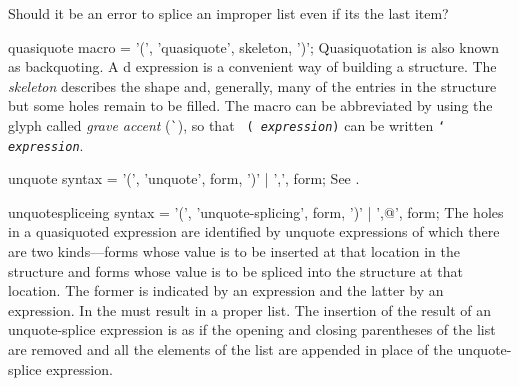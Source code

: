 \gdef\module{syntax-0}
\label{backquote}
%
\begin{optPrivate}
    Should it be an error to splice an improper list even if its the last item?
\end{optPrivate}
%
\begin{optDefinition}

%
\Syntax
\savesyntax\quasiquoteSyntax\vbox{\syntax
quasiquote macro
   = '(', 'quasiquote', skeleton, ')';
\endsyntax}
%
\remarks%
Quasiquotation is also known as backquoting.  A d
expression is a convenient way of building a structure.  The {\em skeleton}
describes the shape and, generally, many of the entries in the structure but
some holes remain to be filled.  The  macro can be
abbreviated by using the glyph called {\em grave accent}
(\verb+`+), so that {\tt
    ( {\em expression})} can be written {\tt `{\em
        expression}}.

%
\Syntax
\savesyntax\unquoteSyntax\vbox{\syntax
unquote syntax
   = '(', 'unquote', form, ')'
   | ',', form;
\endsyntax}
%
\remarks%
See .

%
\Syntax
\savesyntax\unquotespliceSyntax\vbox{\syntax
unquotespliceing syntax
   = '(', 'unquote-splicing', form, ')'
   | ',@', form;
\endsyntax}
%
\remarks%
The holes in a quasiquoted expression are identified by unquote expressions of
which there are two kinds---forms whose value is to be inserted at that location
in the structure and forms whose value is to be spliced into the structure at
that location.  The former is indicated by an  expression and
the latter by an  expression.  In
 the  must result in a proper list.  The
insertion of the result of an unquote-splice expression is as if the opening and
closing parentheses of the list are removed and all the elements of the list are
appended in place of the unquote-splice expression.


\end{optDefinition}

